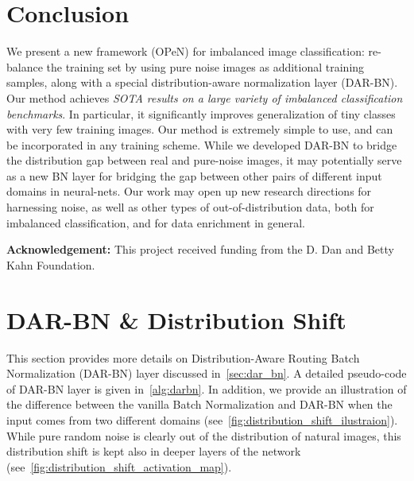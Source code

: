 \documentclass[nohyperref]{article}
\theoremstyle{plain}
\theoremstyle{definition}
\theoremstyle{remark}
\begin{document}
\vspace{-0.1cm}
\section{Conclusion}
We present a new framework (OPeN) for imbalanced image classification: re-balance the training set by using pure noise images as additional training samples, along with a special distribution-aware normalization layer (DAR-BN). Our method achieves \emph{SOTA results on a large variety of imbalanced classification benchmarks}. In particular, it significantly improves generalization of tiny classes with very few training images. 
Our method is extremely simple to use, and can be incorporated in any training scheme. 
While we developed DAR-BN to bridge the distribution gap between real and pure-noise images, it may potentially serve as a new BN layer for bridging the gap between other pairs of different input domains in neural-nets.
Our work may open up new research directions for harnessing noise, as well as other types of out-of-distribution data, both for imbalanced classification, and for  data enrichment in general.


\textbf{Acknowledgement:} This project received funding from the D. Dan and Betty Kahn Foundation. 




\newpage
\appendix
\onecolumn
\clearpage


\section{DAR-BN \& Distribution Shift}\label{appendix:darbn}
This section provides more details on Distribution-Aware Routing Batch Normalization (DAR-BN) layer discussed in~\cref{sec:dar_bn}. A detailed pseudo-code of DAR-BN layer is given in~\cref{alg:darbn}. In addition, we provide an illustration of the difference between the vanilla Batch Normalization and DAR-BN when the input comes from two different domains (see~\cref{fig:distribution_shift_ilustraion}).
While pure random noise is clearly out of the distribution of natural images, this distribution shift is kept also in deeper layers of the network (see~\cref{fig:distribution_shift_activation_map}).
\end{document}
